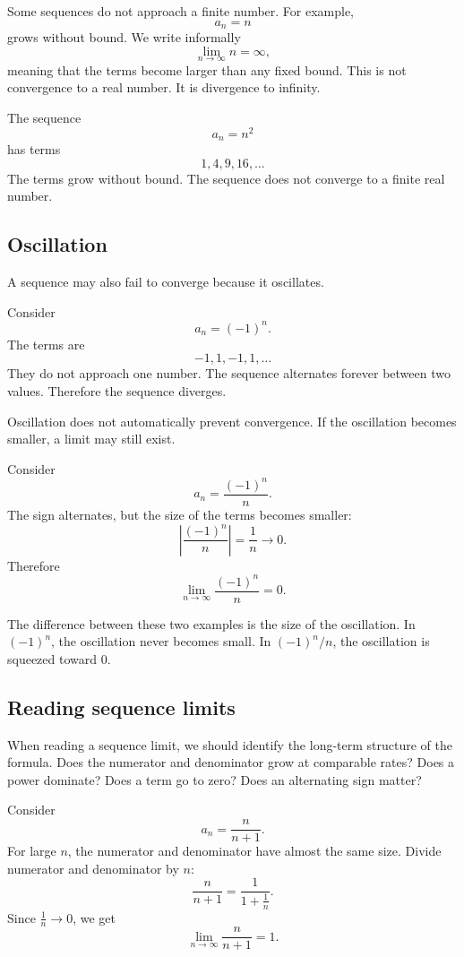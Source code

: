 Some sequences do not approach a finite number. For example,
\[
a_n=n
\]
grows without bound. We write informally
\[
\lim_{n\to\infty} n=\infty,
\]
meaning that the terms become larger than any fixed bound. This is not convergence to a real number. It is divergence to infinity.

\begin{examplebox}
The sequence
\[
a_n=n^2
\]
has terms
\[
1,4,9,16,\ldots
\]
The terms grow without bound. The sequence does not converge to a finite real number.
\end{examplebox}

\subsection*{Oscillation}

A sequence may also fail to converge because it oscillates.

\begin{examplebox}
Consider
\[
a_n=(-1)^n.
\]
The terms are
\[
-1,1,-1,1,\ldots
\]
They do not approach one number. The sequence alternates forever between two values. Therefore the sequence diverges.
\end{examplebox}

Oscillation does not automatically prevent convergence. If the oscillation becomes smaller, a limit may still exist.

\begin{examplebox}
Consider
\[
a_n=\frac{(-1)^n}{n}.
\]
The sign alternates, but the size of the terms becomes smaller:
\[
\left|\frac{(-1)^n}{n}\right|=\frac1n\to0.
\]
Therefore
\[
\lim_{n\to\infty}\frac{(-1)^n}{n}=0.
\]
\end{examplebox}

The difference between these two examples is the size of the oscillation. In \((-1)^n\), the oscillation never becomes small. In \((-1)^n/n\), the oscillation is squeezed toward \(0\).

\subsection*{Reading sequence limits}

When reading a sequence limit, we should identify the long-term structure of the formula. Does the numerator and denominator grow at comparable rates? Does a power dominate? Does a term go to zero? Does an alternating sign matter?

\begin{examplebox}
Consider
\[
a_n=\frac{n}{n+1}.
\]
For large \(n\), the numerator and denominator have almost the same size. Divide numerator and denominator by \(n\):
\[
\frac{n}{n+1}=\frac{1}{1+\frac1n}.
\]
Since \(\frac1n\to0\), we get
\[
\lim_{n\to\infty}\frac{n}{n+1}=1.
\]
\end{examplebox}

